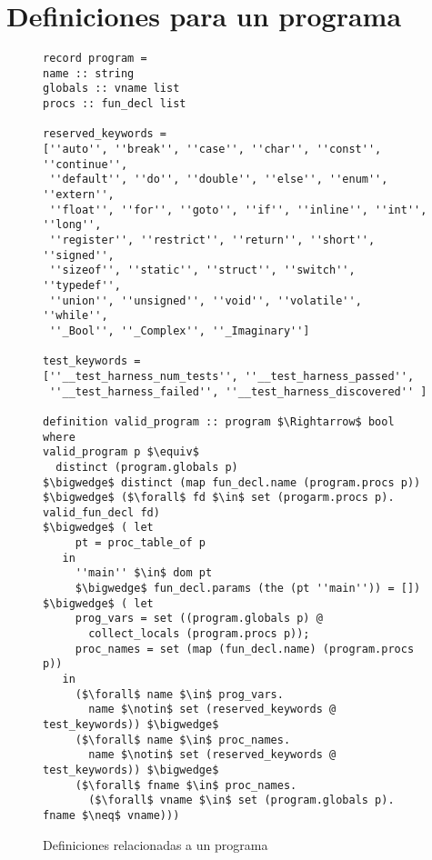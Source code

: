 \chapter{Definiciones para un programa}
\label{ap:prog_def}

\begin{figure}
\begin{lstlisting}[mathescape=true]
record program =
name :: string
globals :: vname list
procs :: fun_decl list

reserved_keywords =
[''auto'', ''break'', ''case'', ''char'', ''const'', ''continue'',
 ''default'', ''do'', ''double'', ''else'', ''enum'', ''extern'',
 ''float'', ''for'', ''goto'', ''if'', ''inline'', ''int'', ''long'',
 ''register'', ''restrict'', ''return'', ''short'', ''signed'',
 ''sizeof'', ''static'', ''struct'', ''switch'', ''typedef'',
 ''union'', ''unsigned'', ''void'', ''volatile'', ''while'',
 ''_Bool'', ''_Complex'', ''_Imaginary'']

test_keywords =
[''__test_harness_num_tests'', ''__test_harness_passed'',
 ''__test_harness_failed'', ''__test_harness_discovered'' ]

definition valid_program :: program $\Rightarrow$ bool where
valid_program p $\equiv$
  distinct (program.globals p)
$\bigwedge$ distinct (map fun_decl.name (program.procs p))
$\bigwedge$ ($\forall$ fd $\in$ set (progarm.procs p). valid_fun_decl fd)
$\bigwedge$ ( let
     pt = proc_table_of p
   in
     ''main'' $\in$ dom pt
     $\bigwedge$ fun_decl.params (the (pt ''main'')) = [])
$\bigwedge$ ( let
     prog_vars = set ((program.globals p) @
       collect_locals (program.procs p));
     proc_names = set (map (fun_decl.name) (program.procs p))
   in
     ($\forall$ name $\in$ prog_vars.
       name $\notin$ set (reserved_keywords @ test_keywords)) $\bigwedge$
     ($\forall$ name $\in$ proc_names.
       name $\notin$ set (reserved_keywords @ test_keywords)) $\bigwedge$
     ($\forall$ fname $\in$ proc_names.
       ($\forall$ vname $\in$ set (program.globals p). fname $\neq$ vname)))
\end{lstlisting}
\caption{Definiciones relacionadas a un programa}
\end{figure}
